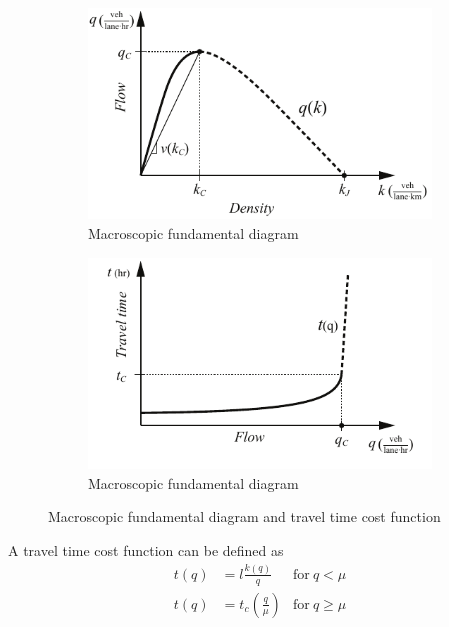 \documentclass{article}
\begin{document}
\begin{figure}[!ht]
     \centering
     \hfill
     \begin{subfigure}[b]{0.4\textwidth}
         \centering
         \includegraphics[width=\textwidth]{diagram_mfd}
         \caption{Macroscopic fundamental diagram}
         \label{fig:mfd}
     \end{subfigure}
     \hfill
     \begin{subfigure}[b]{0.4\textwidth}
         \centering
         \includegraphics[width=\textwidth]{diagram_traveltime}
        \caption{Macroscopic fundamental diagram}
         \label{fig:traveltime}
     \end{subfigure}
     \hfill
     \caption{Macroscopic fundamental diagram and travel time cost function}
\end{figure}

A travel time cost function can be defined as
\begin{align}
    t(q) &= l \frac{k(q)}{q} & \text{for}~q < \mu \\
    t(q) &= t_c \left(\frac{q}{\mu}\right)  & \text{for}~q \geq \mu
\end{align}
\end{document}
